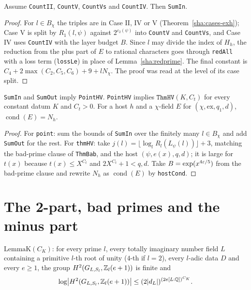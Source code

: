 \begin{lemma}\label{sha:sumin}
Assume \texttt{CountII}, \texttt{CountV}, \texttt{CountVs} and \texttt{CountIV}. Then \texttt{SumIn}.
\end{lemma}
\begin{proof}
For $l\in B_{\chi}$ the triples are in Case II, IV or V (Theorem~\ref{sha:cases-exh}); Case
V is split by $R_1(l,\psi)$ against $2^{c_2(\psi)}$ into \texttt{CountV} and \texttt{CountVs},
and Case IV uses \texttt{CountIV} with the layer budget $B$. Since $l$ may divide the index of
$H_h$, the reduction from the plus part of $E$ to rational characters goes through
\texttt{redAll} with a loss term (\texttt{lossLe}) in place of Lemma~\ref{sha:redprime}. The
final constant is $C_4+2\max(C_2,C_5,C_6)+9+lN_{\chi}$. The proof was read at the level of its
case split.
\end{proof}

\begin{lemma}\label{sha:point-thmhv}
\texttt{SumIn} and \texttt{SumOut} imply \texttt{PointHV}. \texttt{PointHV} implies
$\texttt{ThmHV}(K,C_t)$ for every constant datum $K$ and $C_t>0$. For a host $h$ and a
$\chi$-field $E$ for $(\chi,\mathrm{ex},q_1,d)$, $\operatorname{cond}(E)=N_h$.
\end{lemma}
\begin{proof}
For \texttt{point}: sum the bounds of \texttt{SumIn} over the finitely many $l\in B_{\chi}$ and
add \texttt{SumOut} for the rest. For \texttt{thmHV}: take $j(l)=\lfloor\log_l R_l(L_{\psi}(l))\rfloor+3$,
matching the bad-prime clause of \texttt{ThmBab}, and the host $(\psi,e(x),q,d)$; it is
large for $t(x)$ because $t(x)\le X^{C_t}$ and $2X^{C_t}+1<q,d$. Take
$B=\exp(x^{4\varepsilon/5})$ from the bad-prime clause and rewrite $N_h$ as
$\operatorname{cond}(E)$ by \texttt{hostCond}.
\end{proof}

\section{The 2-part, bad primes and the minus part}

\begin{definition}\label{sha:lemmak}
$\mathrm{LemmaK}(C_K)$: for every prime $l$, every totally imaginary number field $L$
containing a primitive $l$-th root of unity ($4$-th if $l=2$), every $l$-adic data $D$ and
every $e\ge1$, the group $H^2(G_{L,S_l},\mathbb{Z}_l(e+1))$ is finite and
\[
\log\bigl|H^2(G_{L,S_l},\mathbb{Z}_l(e+1))\bigr|\le(2|d_L|)^{(2e[L:\mathbb{Q}])^{C_K}} .
\]
\end{definition}

